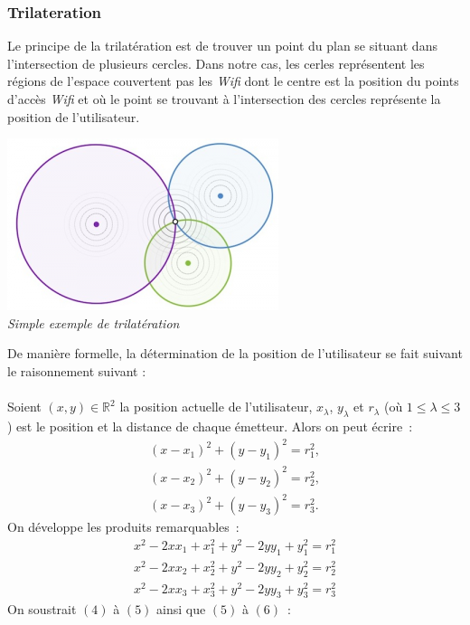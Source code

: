 \documentclass[11pt,a4paper]{article}
\begin{document}
    \subsubsection{Trilateration}
      Le principe de la trilatération est de trouver un point du plan se situant dans l'intersection de plusieurs cercles. Dans notre cas, les cerles représentent les régions de l'espace couvertent pas les \textit{Wifi} dont le centre est la position du points d'accès \textit{Wifi} et où le point se trouvant à l'intersection des cercles représente la position de l'utilisateur.
      \begin{center}
        \includegraphics[scale=0.8]{trilateration.png}\\
        \textit{Simple exemple de trilatération}
      \end{center}
      De manière formelle, la détermination de la position de l'utilisateur se fait suivant le raisonnement suivant :\\\\
      Soient $(x, y) \in \mathbb R^2$ la position actuelle de l'utilisateur, $x_{\lambda}$, $y_{\lambda}$ et $r_{\lambda}$ (où $1 \leq \lambda \leq 3$) est le position et la distance de chaque
    émetteur. Alors on peut écrire~:
      \begin{align}
        (x-x_{1})^{2}+(y-y_{1})^{2} = r_{1}^{2}, \\
        (x-x_{2})^{2}+(y-y_{2})^{2} = r_{2}^{2}, \\
        (x-x_{3})^{2}+(y-y_{3})^{2} = r_{3}^{2}.
      \end{align}
      On développe les produits remarquables~:
      \begin{align}
        x^{2}-2xx_{1}+x_{1}^{2}+y^{2}-2yy_{1}+y_{1}^{2} = r_{1}^{2} \\
        x^{2}-2xx_{2}+x_{2}^{2}+y^{2}-2yy_{2}+y_{2}^{2} = r_{2}^{2} \\
        x^{2}-2xx_{3}+x_{3}^{2}+y^{2}-2yy_{3}+y_{3}^{2} = r_{3}^{2}
      \end{align}
      On soustrait $(4)$ à $(5)$ ainsi que $(5)$ à $(6)$~:
\end{document}
